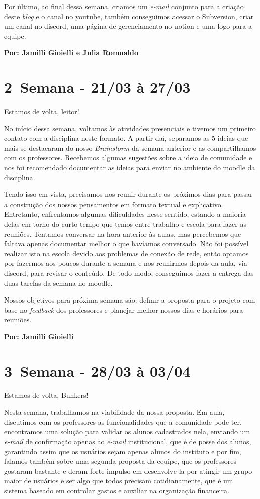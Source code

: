 Por último, ao final dessa semana, criamos um \textsl{e-mail} conjunto para a criação deste \textsl{blog} e o canal no \gls{youtube}, também conseguimos acessar o Subversion, criar um canal no \gls{discord}, uma página de gerenciamento no \gls{notion} e uma logo para a equipe.


 \textbf{Por: Jamilli Gioielli e Julia Romualdo}

\section{2\textordfeminine \, Semana - 21/03 à 27/03}

Estamos de volta, leitor!

No início dessa semana, voltamos às atividades presenciais e tivemos um primeiro contato com a disciplina neste formato. A partir daí, separamos as 5 ideias que mais se destacaram do nosso \textsl{Brainstorm} da semana anterior e as compartilhamos com os professores. Recebemos algumas sugestões sobre a ideia de comunidade e nos foi recomendado documentar as ideias para enviar no ambiente do \gls{moodle} da disciplina. 

Tendo isso em vista, precisamos nos reunir durante os próximos dias para passar a construção dos nossos pensamentos em formato textual e explicativo. Entretanto, enfrentamos algumas dificuldades nesse sentido, estando a maioria delas em torno do curto tempo que temos entre trabalho e escola para fazer as reuniões. Tentamos conversar na hora anterior às aulas, mas percebemos que faltava apenas documentar melhor o que havíamos conversado. Não foi possível realizar isto na escola devido aos problemas de conexão de rede, então optamos por fazermos aos poucos durante a semana e nos reunirmos depois da aula, via \gls{discord}, para revisar o conteúdo. De todo modo, conseguimos fazer a entrega das duas tarefas da semana no \gls{moodle}.

Nossos objetivos para próxima semana são: definir a proposta para o projeto com base no \textsl{feedback} dos professores e planejar melhor nossos dias e horários para reuniões.

\textbf{Por:  Jamilli Gioielli} 

\section{3\textordfeminine \, Semana - 28/03 à 03/04}
Estamos de volta, Bunkers!

Nesta semana, trabalhamos na viabilidade da nossa proposta. Em aula, discutimos com os professores as funcionalidades que a comunidade pode ter, encontramos uma solução para validar os alunos cadastrados nela, enviando um \textsl{e-mail} de confirmação apenas ao \textsl{e-mail} institucional, que é de posse dos alunos, garantindo assim que os usuários sejam apenas alunos do instituto e por fim, falamos também sobre uma segunda proposta da equipe, que os professores gostaram bastante e deram forte impulso em desenvolve-la por atingir um grupo maior de usuários e ser algo que todos precisam cotidianamente, que é um sistema baseado em controlar gastos e auxiliar na organização financeira.

